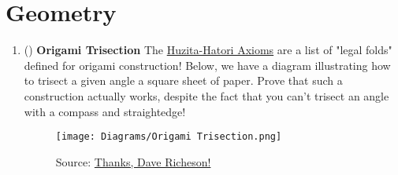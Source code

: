 \documentclass[11pt]{scrartcl}
\begin{document}
\section{Geometry}
\begin{enumerate}[label=\textbf{G\arabic*}.]
    \item (\fullchili) \textbf{Origami Trisection} \newline
    The \href{https://en.wikipedia.org/wiki/Huzita\%E2\%80\%93Hatori_axioms}{Huzita-Hatori Axioms} are a list of "legal folds" defined for origami construction! Below, we have a diagram illustrating how to trisect a given angle a square sheet of paper. Prove that such a construction actually works, despite the fact that you can't trisect an angle with a compass and straightedge!
    \newline
    \begin{figure}[h]
        \centering
        \texttt{[image: Diagrams/Origami Trisection.png]}
        \caption{Source: \href{https://divisbyzero.files.wordpress.com/2012/06/origamitrisection.png?w=500}{Thanks, Dave Richeson!}}
        \label{fig:Origami_Trisection}
    \end{figure}
\end{enumerate}

\newpage
\end{document}
